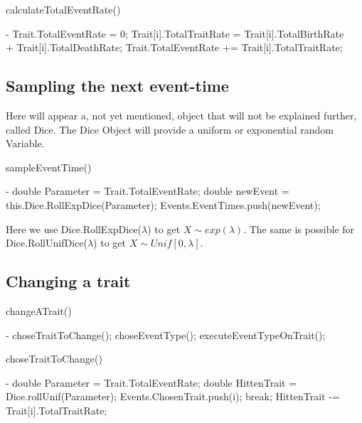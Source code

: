 \documentclass{article}
\begin{document}
\begin{algorithm}[H]
	\caption{calculateTotalEventRate()}
	\begin{algorithmic}[1]
		\REQUIRE -
		\STATE Trait.TotalEventRate = 0;
			\STATE Trait[i].TotalTraitRate = Trait[i].TotalBirthRate \\ 
			\noindent\hspace*{36mm}+ Trait[i].TotalDeathRate;
			\STATE Trait.TotalEventRate += Trait[i].TotalTraitRate;
		\ENDFOR
	\end{algorithmic}
\end{algorithm}

\subsection{Sampling the next event-time}
Here will appear a, not yet mentioned, object that will not be explained further, called Dice. The Dice Object will provide a uniform or exponential random Variable.\\
\begin{algorithm}[H]
	\caption{sampleEventTime()}
	\begin{algorithmic}[1]
		\REQUIRE -
		\STATE double Parameter = Trait.TotalEventRate;
		\STATE double newEvent = this.Dice.RollExpDice(Parameter);
		\STATE Events.EventTimes.push(newEvent);
	\end{algorithmic}
\end{algorithm}
Here we use Dice.RollExpDice($\lambda$) to get $X\sim exp(\lambda)$. The same is possible for  Dice.RollUnifDice($\lambda$) to get $X\sim Unif[0,\lambda]$.\\

\subsection{Changing a trait}

\begin{algorithm}[H]
	\caption{changeATrait()}
	\begin{algorithmic}[1]
		\REQUIRE -
		\STATE choseTraitToChange();
		\STATE choseEventType();
		\STATE executeEventTypeOnTrait();
	\end{algorithmic}
\end{algorithm}

\begin{algorithm}[H]
	\caption{choseTraitToChange()}
	\begin{algorithmic}[1]
		\REQUIRE -
		\STATE double Parameter = Trait.TotalEventRate;
		\STATE double HittenTrait = Dice.rollUnif(Parameter);
				\STATE Events.ChosenTrait.push(i);
				\STATE break;
			\ENDIF
			\STATE HittenTrait -= Trait[i].TotalTraitRate;
		\ENDFOR
	\end{algorithmic}
\end{algorithm}
\end{document}
